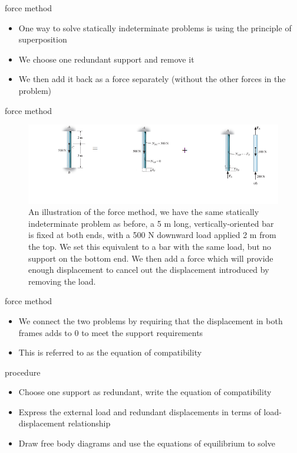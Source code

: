 \documentclass[
  letterpaper,
  ignorenonframetext,
  aspectratio=43,
  handout,
  12pt]{beamer}
\providecommand{\tightlist}{%
  \setlength{\itemsep}{0pt}\setlength{\parskip}{0pt}}
\providecommand{\tightlist}{%
\setlength{\itemsep}{0pt}\setlength{\parskip}{0pt}}
\let\Oldincludegraphics\includegraphics
\renewcommand{\includegraphics}[2][]{\Oldincludegraphics[width=\textwidth,height=0.7\textheight,keepaspectratio]{#2}}
\begin{document}
\begin{frame}{force method}
\protect\hypertarget{force-method-1}{}
\begin{itemize}
\tightlist
\item
  One way to solve statically indeterminate problems is using the
  principle of superposition
\item
  We choose one redundant support and remove it
\item
  We then add it back as a force separately (without the other forces in
  the problem)
\end{itemize}
\end{frame}

\begin{frame}{force method}
\protect\hypertarget{force-method-2}{}
\begin{figure}
\centering
\includegraphics{../images/force-method.png}
\caption{An illustration of the force method, we have the same
statically indeterminate problem as before, a 5 m long,
vertically-oriented bar is fixed at both ends, with a 500 N downward
load applied 2 m from the top. We set this equivalent to a bar with the
same load, but no support on the bottom end. We then add a force which
will provide enough displacement to cancel out the displacement
introduced by removing the load.}
\end{figure}
\end{frame}

\begin{frame}{force method}
\protect\hypertarget{force-method-3}{}
\begin{itemize}
\tightlist
\item
  We connect the two problems by requiring that the displacement in both
  frames adds to 0 to meet the support requirements
\item
  This is referred to as the equation of compatibility
\end{itemize}
\end{frame}

\begin{frame}{procedure}
\protect\hypertarget{procedure}{}
\begin{itemize}
\tightlist
\item
  Choose one support as redundant, write the equation of compatibility
\item
  Express the external load and redundant displacements in terms of
  load-displacement relationship
\item
  Draw free body diagrams and use the equations of equilibrium to solve
\end{itemize}
\end{frame}
\end{document}
